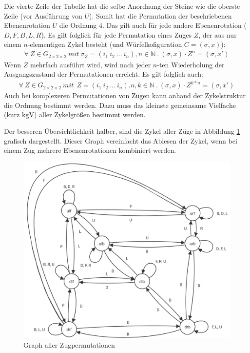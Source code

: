 \documentclass[12pt,a4paper, usenames, dvipsnames]{article}
\theoremstyle{mystyle}
\theoremstyle{definition}
\newcommand{\Gtwo}{\ensuremath{G_{2\times 2\times 2}}}
\begin{document}
Die vierte Zeile der Tabelle hat die selbe Anordnung der Steine wie die oberste Zeile (vor Ausführung von $U$). 
Somit hat die Permutation der beschriebenen Ebenenrotation $U$ die Ordnung 4. Das gilt auch für jede andere Ebenenrotation ($D, F, B, L, R$).
Es gilt folglich für jede Permutation eines Zuges $Z$, der aus nur einem $n$-elementigen Zykel besteht (und Würfelkofiguration $C=(\sigma, x)$): 
\begin{align*}
\forall \ Z \in \Gtwo \ \textit{mit} \ \sigma_Z=(i_1 \ i_2 \ ... \ i_n), n \in \mathbb{N} \ . \  (\sigma, x) \cdot Z^n= (\sigma, x')
\end{align*}
Wenn $Z$ mehrfach ausführt wird, wird nach jeder $n$-ten Wiederholung der Ausgangszustand der Permutationen erreicht. \cite{TD} 
Es gilt folglich auch:
\begin{align*}
\forall \ Z \in \Gtwo \ \textit{mit} \ \ Z=(i_1 \ i_2 \ ... \ i_n). n,k \in \mathbb{N} \ . \  {(\sigma, x) \cdot Z^{k*n}=(\sigma, x') }
\end{align*}
Auch bei komplexeren Permutationen von Zügen kann anhand der Zykelstruktur die Ordnung bestimmt werden. Dazu muss das kleinste gemeinsame Vielfache (kurz kgV) aller Zykelgrößen bestimmt werden. \cite{TD}

 
Der besseren Übersichtlichkeit halber, sind die Zykel aller Züge in Abbildung \ref{Abbildung_GraphAllerPermutationen} grafisch dargestellt.
Dieser Graph vereinfacht das Ablesen der Zykel, wenn bei einem Zug mehrere Ebenenrotationen kombiniert werden.
\begin{figure}[H]
\centering
\includegraphics[scale=0.25]{graph_zug1.png}
\caption[Graph aller Zugpermutationen]{Graph aller Zugpermutationen}
\label{Abbildung_GraphAllerPermutationen}
\end{figure}
\end{document}
